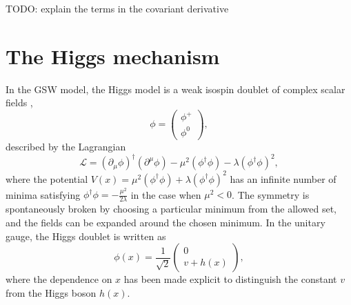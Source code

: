 TODO: explain the terms in the covariant derivative

%
%
%
%

\section{The Higgs mechanism}

In the GSW model, the Higgs model is a weak isospin doublet of complex scalar fields \cite{Thomson:2013zua},
\begin{equation}
\phi = \begin{pmatrix} \phi^+ \\ \phi^0 \end{pmatrix},
\end{equation}
described by the Lagrangian
\begin{equation}
\mathcal{L} = (\partial_\mu \phi)^\dag (\partial^\mu \phi) - \mu^2(\phi^\dag\phi) - \lambda(\phi^\dag \phi)^2,
\label{eq:higgs_lag}
\end{equation}
where the potential $V(x) = \mu^2(\phi^\dag\phi) + \lambda(\phi^\dag \phi)^2$
has an infinite number of minima satisfying $\phi^\dag \phi = -\frac{\mu^2}{2\lambda}$
in the case when $\mu^2 < 0$. The symmetry is spontaneously broken by choosing a
particular minimum from the allowed set, and the fields can be expanded around the chosen minimum.
In the unitary gauge, the Higgs doublet is written as
\begin{equation}
\phi(x) = \frac{1}{\sqrt{2}} \begin{pmatrix} 0 \\ v + h(x) \end{pmatrix},
\end{equation}
where the dependence on $x$ has been made explicit to distinguish the constant
$v$ from the Higgs boson $h(x)$.

